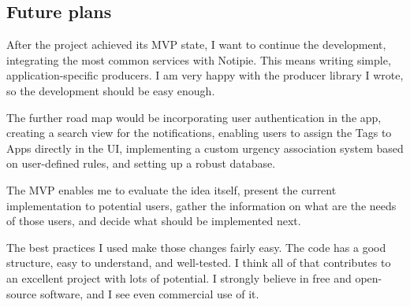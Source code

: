 \subsection{Future plans}\label{sec:future-plans}

After the project achieved its \ac{MVP} state,
I want to continue the development,
integrating the most common services
with Notipie.
This means writing simple,
application-specific producers.
I am very happy with the producer library I wrote,
so the development should be easy enough.

The further road map would be
incorporating user authentication in the app,
creating a search view for the notifications,
enabling users to assign the Tags to Apps
directly in the \ac{UI},
implementing a custom urgency association system
based on user-defined rules,
and setting up a robust database.

The \ac{MVP} enables me to evaluate the idea itself,
present the current implementation to potential users,
gather the information on what are the needs
of those users,
and decide what should be implemented next.

The best practices I used make those changes
fairly easy.
The code has a good structure,
easy to understand,
and well-tested.
I think all of that contributes
to an excellent project
with lots of potential.
I strongly believe in
free and open-source software,
and I see even commercial use of it.
